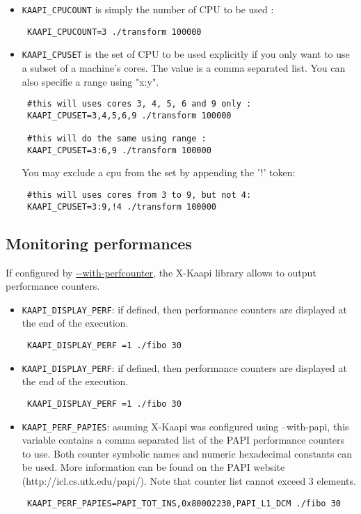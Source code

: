 \documentclass{article}
\newcommand{\kaapi}{\textsc{X}-Kaapi\xspace}
\begin{document}
\begin{itemize}
\item \verb+KAAPI_CPUCOUNT+ is simply the number of CPU to be used :

\begin{verbatim}
 KAAPI_CPUCOUNT=3 ./transform 100000
\end{verbatim}

\item \verb+KAAPI_CPUSET+ is the set of CPU to be used explicitly if you only want to use a subset of a machine's cores. The value is a comma separated list. You can also specifie a range using "x:y".

\begin{verbatim}
 #this will uses cores 3, 4, 5, 6 and 9 only :
 KAAPI_CPUSET=3,4,5,6,9 ./transform 100000
 
 #this will do the same using range :
 KAAPI_CPUSET=3:6,9 ./transform 100000
\end{verbatim}

You may exclude a cpu from the set by appending the '!' token:
\begin{verbatim}
 #this will uses cores from 3 to 9, but not 4:
 KAAPI_CPUSET=3:9,!4 ./transform 100000
\end{verbatim}

\end{itemize}

\subsection{Monitoring performances}
If configured by \url{--with-perfcounter}, the \kaapi library allows to output performance counters.

\begin{itemize}
\item \verb+KAAPI_DISPLAY_PERF+: if defined, then performance counters are displayed at the end of the execution.
\begin{verbatim}
 KAAPI_DISPLAY_PERF =1 ./fibo 30
\end{verbatim}

\item \verb+KAAPI_DISPLAY_PERF+: if defined, then performance counters are displayed at the end of the execution.
\begin{verbatim}
 KAAPI_DISPLAY_PERF =1 ./fibo 30
\end{verbatim}

\item \verb+KAAPI_PERF_PAPIES+: asuming \kaapi was configured using --with-papi, this variable contains a comma separated list of the PAPI performance counters to use. Both counter symbolic names and numeric hexadecimal constants can be used. More information can be found on the PAPI website (http://icl.cs.utk.edu/papi/). Note that counter list cannot exceed 3 elements.
\begin{verbatim}
 KAAPI_PERF_PAPIES=PAPI_TOT_INS,0x80002230,PAPI_L1_DCM ./fibo 30
\end{verbatim}
\end{itemize}
\end{document}
